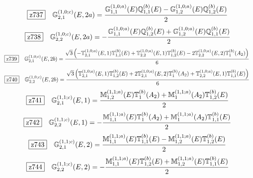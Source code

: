 \documentclass[fleqn,10pt,landscape]{jsarticle}
\begin{document}
\begin{dmath*}
\hspace*{3mm}\fbox{z737}\quad \mathbb{G}_{2,1}^{(1,0;c)}(E,2a)=\frac{\mathbb{G}_{1,1}^{(1,0;a)}(E) \mathbb{Q}_{1,1}^{(b)}(E) - \mathbb{G}_{1,2}^{(1,0;a)}(E) \mathbb{Q}_{1,2}^{(b)}(E)}{2}
\end{dmath*}
\begin{dmath*}
\hspace*{3mm}\fbox{z738}\quad \mathbb{G}_{2,2}^{(1,0;c)}(E,2a)=- \frac{\mathbb{G}_{1,1}^{(1,0;a)}(E) \mathbb{Q}_{1,2}^{(b)}(E) + \mathbb{G}_{1,2}^{(1,0;a)}(E) \mathbb{Q}_{1,1}^{(b)}(E)}{2}
\end{dmath*}
\begin{dmath*}
\hspace*{3mm}\fbox{z739}\quad \mathbb{G}_{2,1}^{(1,0;c)}(E,2b)=\frac{\sqrt{3} \left(- \mathbb{T}_{2,1}^{(1,0;a)}(E,1) \mathbb{T}_{1,1}^{(b)}(E) + \mathbb{T}_{2,2}^{(1,0;a)}(E,1) \mathbb{T}_{1,2}^{(b)}(E) - 2 \mathbb{T}_{2,2}^{(1,0;a)}(E,2) \mathbb{T}_{1}^{(b)}(A_{2})\right)}{6}
\end{dmath*}
\begin{dmath*}
\hspace*{3mm}\fbox{z740}\quad \mathbb{G}_{2,2}^{(1,0;c)}(E,2b)=\frac{\sqrt{3} \left(\mathbb{T}_{2,1}^{(1,0;a)}(E,1) \mathbb{T}_{1,2}^{(b)}(E) + 2 \mathbb{T}_{2,1}^{(1,0;a)}(E,2) \mathbb{T}_{1}^{(b)}(A_{2}) + \mathbb{T}_{2,2}^{(1,0;a)}(E,1) \mathbb{T}_{1,1}^{(b)}(E)\right)}{6}
\end{dmath*}
\begin{dmath*}
\hspace*{3mm}\fbox{z741}\quad \mathbb{G}_{2,1}^{(1,1;c)}(E,1)=\frac{\mathbb{M}_{1,2}^{(1,1;a)}(E) \mathbb{T}_{1}^{(b)}(A_{2}) + \mathbb{M}_{1}^{(1,1;a)}(A_{2}) \mathbb{T}_{1,2}^{(b)}(E)}{2}
\end{dmath*}
\begin{dmath*}
\hspace*{3mm}\fbox{z742}\quad \mathbb{G}_{2,2}^{(1,1;c)}(E,1)=- \frac{\mathbb{M}_{1,1}^{(1,1;a)}(E) \mathbb{T}_{1}^{(b)}(A_{2}) + \mathbb{M}_{1}^{(1,1;a)}(A_{2}) \mathbb{T}_{1,1}^{(b)}(E)}{2}
\end{dmath*}
\begin{dmath*}
\hspace*{3mm}\fbox{z743}\quad \mathbb{G}_{2,1}^{(1,1;c)}(E,2)=\frac{\mathbb{M}_{1,1}^{(1,1;a)}(E) \mathbb{T}_{1,1}^{(b)}(E) - \mathbb{M}_{1,2}^{(1,1;a)}(E) \mathbb{T}_{1,2}^{(b)}(E)}{2}
\end{dmath*}
\begin{dmath*}
\hspace*{3mm}\fbox{z744}\quad \mathbb{G}_{2,2}^{(1,1;c)}(E,2)=- \frac{\mathbb{M}_{1,1}^{(1,1;a)}(E) \mathbb{T}_{1,2}^{(b)}(E) + \mathbb{M}_{1,2}^{(1,1;a)}(E) \mathbb{T}_{1,1}^{(b)}(E)}{2}
\end{dmath*}
\vspace{5mm}
\end{document}
